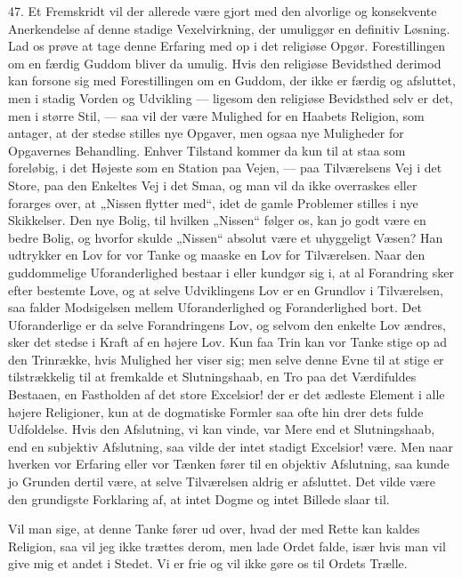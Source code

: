 \documentclass[12pt,a4paper,openany]{book}
\newcommand{\opage}[1]{\marginnote{\footnotesize\textit{[#1]}}}
\begin{document}
47. Et Fremskridt vil der allerede være gjort med den alvorlige og
konsekvente Anerkendelse af denne stadige Vexelvirkning, der umuliggør
en definitiv Løsning. Lad os prøve at tage denne Erfaring med op i det
religiøse Opgør. Forestillingen om en færdig Guddom bliver da umulig.
Hvis den religiøse Bevidsthed derimod kan forsone sig med Forestillingen
om en Guddom, der ikke er færdig og afsluttet, men i stadig Vorden og
Udvikling --- ligesom den religiøse Bevidsthed selv er det, men i større
Stil, --- saa vil der være Mulighed for en Haabets Religion, som
antager, at der stedse stilles nye Opgaver, men ogsaa nye Muligheder for
Opgavernes Behandling. Enhver Tilstand kommer da kun til at staa som
foreløbig, i det Højeste som en Station paa Vejen, --- paa Tilværelsens
Vej i det Store, paa den Enkeltes Vej i det Smaa, og man vil da ikke
overraskes eller forarges over, at „Nissen flytter med“, idet de gamle
Problemer stilles i nye Skikkelser. Den nye Bolig, til hvilken „Nissen“
følger os, kan jo godt være en bedre Bolig, og hvorfor skulde „Nissen“
absolut være et uhyggeligt Væsen? Han udtrykker en Lov for vor Tanke og
maaske en Lov for Tilværelsen. Naar den guddommelige Uforanderlighed
bestaar i eller kundgør sig i, at al Forandring sker efter bestemte
Love, og at selve Udviklingens Lov er en Grundlov i Tilværelsen, saa
falder Modsigelsen mellem Uforanderlighed og Foranderlighed bort. Det
Uforanderlige er da selve Forandringens Lov, og selvom den enkelte Lov
ændres, sker det stedse i Kraft af en højere Lov. Kun faa Trin kan vor
Tanke stige op ad den Trinrække, hvis Mulighed her viser sig; men selve
denne Evne til at stige er tilstrækkelig til at fremkalde et
Slutningshaab, en Tro paa det Værdifuldes Bestaaen, en Fastholden af det
store Excelsior! der er det ædleste Element i alle højere Religioner,
kun at de dogmatiske Formler saa ofte hin%
\opage{109}drer dets fulde Udfoldelse. Hvis den Afslutning, vi kan
vinde, var Mere end et Slutningshaab, end en subjektiv Afslutning, saa
vilde der intet stadigt Excelsior! være. Men naar hverken vor Erfaring
eller vor Tænken fører til en objektiv Afslutning, saa kunde jo Grunden
dertil være, at selve Tilværelsen aldrig er afsluttet. Det vilde være
den grundigste Forklaring af, at intet Dogme og intet Billede slaar til.

Vil man sige, at denne Tanke fører ud over, hvad der med Rette kan
kaldes Religion, saa vil jeg ikke trættes derom, men lade Ordet falde,
især hvis man vil give mig et andet i Stedet. Vi er frie og vil ikke
gøre os til Ordets Trælle.
\end{document}
